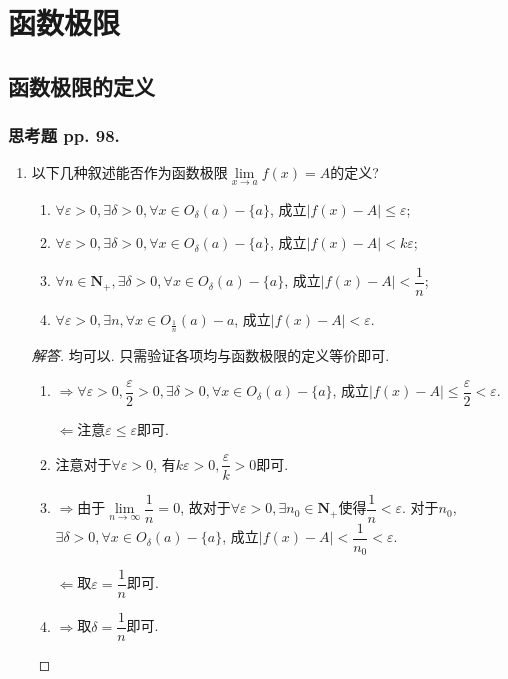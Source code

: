 \documentclass[a4paper,11pt,twoside]{ctexbook}
\begin{document}
\fi

\setcounter{chapter}{3}
\chapter{函数极限}
\section{函数极限的定义}
\subsection{思考题 pp. 98.}
\begin{enumerate}
	\item 以下几种叙述能否作为函数极限$\lim\limits_{x\to a} f(x)=A$的定义?
	      \begin{enumerate}[(1)]
		      \item $\forall\varepsilon>0, \exists \delta>0, \forall x\in O_{\delta}(a)-\{a\}$, 成立$|f(x)-A|\leqslant\varepsilon$;
		      \item $\forall\varepsilon>0, \exists \delta>0, \forall x\in O_{\delta}(a)-\{a\}$, 成立$|f(x)-A|<k\varepsilon$;
		      \item $\forall n\in\mathbf{N}_{+}, \exists \delta>0, \forall x\in O_{\delta}(a)-\{a\}$, 成立$|f(x)-A|<\dfrac{1}{n}$;
		      \item $\forall\varepsilon>0, \exists n, \forall x\in O_{\frac{1}{n}}(a)-{a}$, 成立$|f(x)-A|<\varepsilon$.
	      \end{enumerate}
	      \begin{proof}[解答]
		      均可以. 只需验证各项均与函数极限的定义等价即可.
		      \begin{enumerate}[(1)]
			      \item $\Rightarrow$$\forall\varepsilon>0, \dfrac{\varepsilon}{2}>0, \exists\delta>0, \forall x\in O_{\delta}(a)-\{a\}$,  成立$|f(x)-A|\leqslant\dfrac{\varepsilon}{2}<\varepsilon$.

			            $\Leftarrow$注意$\varepsilon\leqslant\varepsilon$即可.
			      \item 注意对于$\forall\varepsilon>0$, 有$k\varepsilon>0, \dfrac{\varepsilon}{k}>0$即可.
			      \item $\Rightarrow$由于$\lim\limits_{n\to\infty} \dfrac{1}{n}=0$, 故对于$\forall\varepsilon>0, \exists n_0\in\mathbf{N}_{+}$使得$\dfrac{1}{n}<\varepsilon$. 对于$n_0$, $\exists\delta>0, \forall x\in O_{\delta}(a)-\{a\}$, 成立$|f(x)-A|<\dfrac{1}{n_0}<\varepsilon$.

			            $\Leftarrow$取$\varepsilon=\dfrac{1}{n}$即可.
			      \item $\Rightarrow$取$\delta=\dfrac{1}{n}$即可.


\end{enumerate}
\end{proof}
\end{enumerate}
\end{document}
